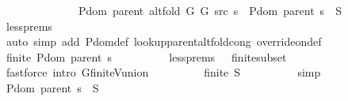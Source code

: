 \begin{isabellebody}
\ \ \ \ \isamarkupfalse%
\ {\isacharminus}{\kern0pt}\isanewline
\ \ \ \ \ \ \isamarkupfalse%
\ {\isachardoublequoteopen}P{\isachardot}{\kern0pt}dom\ {\isacharparenleft}{\kern0pt}parent\ {\isacharparenleft}{\kern0pt}alt{\isacharunderscore}{\kern0pt}fold\ G{}\ G{}\ src\ s{\isacharparenright}{\kern0pt}{\isacharparenright}{\kern0pt}\ {\isacharequal}{\kern0pt}\ P{\isachardot}{\kern0pt}dom\ {\isacharparenleft}{\kern0pt}parent\ s{\isacharparenright}{\kern0pt}\ {\isasymunion}\ {\isacharquery}{\kern0pt}S{\isachardoublequoteclose}\isanewline
\ \ \ \ \ \ \ \ \isamarkupfalse%
\ less{\isachardot}{\kern0pt}prems{\isacharparenleft}{\kern0pt}{}{\isacharcomma}{\kern0pt}\ {}{\isacharcomma}{\kern0pt}\ {}{\isacharparenright}{\kern0pt}\isanewline
\ \ \ \ \ \ \ \ \isamarkupfalse%
\ {\isacharparenleft}{\kern0pt}auto\ simp\ add{\isacharcolon}{\kern0pt}\ P{\isachardot}{\kern0pt}dom{\isacharunderscore}{\kern0pt}def\ lookup{\isacharunderscore}{\kern0pt}parent{\isacharunderscore}{\kern0pt}alt{\isacharunderscore}{\kern0pt}fold{\isacharunderscore}{\kern0pt}cong\ override{\isacharunderscore}{\kern0pt}on{\isacharunderscore}{\kern0pt}def{\isacharparenright}{\kern0pt}\isanewline
\ \ \ \ \ \ \isamarkupfalse%
\ \isamarkupfalse%
\ {\isachardoublequoteopen}finite\ {\isacharparenleft}{\kern0pt}P{\isachardot}{\kern0pt}dom\ {\isacharparenleft}{\kern0pt}parent\ s{\isacharparenright}{\kern0pt}{\isacharparenright}{\kern0pt}{\isachardoublequoteclose}\isanewline
\ \ \ \ \ \ \ \ \isamarkupfalse%
\ less{\isachardot}{\kern0pt}prems{\isacharparenleft}{\kern0pt}{}{\isacharcomma}{\kern0pt}\ {}{\isacharcomma}{\kern0pt}\ {}{\isacharparenright}{\kern0pt}\ finite{\isacharunderscore}{\kern0pt}subset\isanewline
\ \ \ \ \ \ \ \ \isamarkupfalse%
\ {\isacharparenleft}{\kern0pt}fastforce\ intro{\isacharcolon}{\kern0pt}\ G{\isachardot}{\kern0pt}finite{\isacharunderscore}{\kern0pt}V{\isacharunderscore}{\kern0pt}union{\isacharparenright}{\kern0pt}\isanewline
\ \ \ \ \ \ \isamarkupfalse%
\ \isamarkupfalse%
\ {\isachardoublequoteopen}finite\ {\isacharquery}{\kern0pt}S{\isachardoublequoteclose}\isanewline
\ \ \ \ \ \ \ \ \isamarkupfalse%
\ simp\isanewline
\ \ \ \ \ \ \isamarkupfalse%
\ \isamarkupfalse%
\ {\isachardoublequoteopen}P{\isachardot}{\kern0pt}dom\ {\isacharparenleft}{\kern0pt}parent\ s{\isacharparenright}{\kern0pt}\ {\isasyminter}\ {\isacharquery}{\kern0pt}S\ {\isacharequal}{\kern0pt}\ {\isacharbraceleft}{\kern0pt}{\isacharbraceright}{\kern0pt}{\isachardoublequoteclose}\isanewline

\end{isabellebody}
